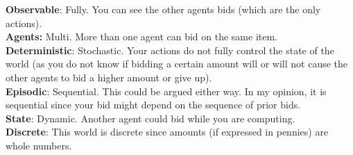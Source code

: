 \documentclass[11pt,letterpaper,addpoints]{exam}
\begin{document}
\begin{questions}
\begin{solutionorbox}[4.0 in]
{\bf Observable}: Fully.  You can see the other agents bids (which are the only actions). \\
{\bf Agents:}  Multi. More than one agent can bid on the same item. \\
{\bf Deterministic}: Stochastic.  Your actions do not fully control the state of the world (as you do 
not know if bidding a certain amount will or will not cause the other agents to bid a higher amount or
give up). \\
{\bf Episodic}: Sequential.  This could be argued either way.  In my opinion, it is sequential since
your bid might depend on the sequence of prior bids. \\
{\bf State}: Dynamic.  Another agent could bid while you are computing. \\
{\bf Discrete}: This world is discrete since amounts (if expressed in pennies) are whole numbers. \\
\end{solutionorbox}
\end{questions}
\end{document}
